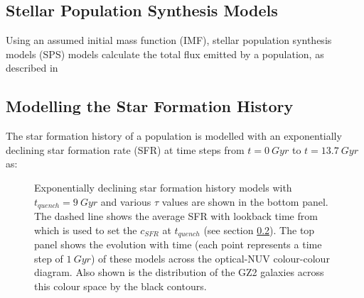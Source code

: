 \documentclass{mn2e}
\begin{document}
\subsection{Stellar Population Synthesis Models}
Using an assumed initial mass function (IMF),  stellar population synthesis models (SPS) models calculate the total flux emitted by a population, as described in \cite{BC03}

\subsection{Modelling the Star Formation History}\label{sfh}
The star formation history of a population is modelled with an exponentially declining star formation rate (SFR) at time steps from $t =0 ~Gyr$ to $t=13.7 ~Gyr$ as:

\begin{figure}
\caption{Exponentially declining star formation history models with $t_{quench}=9~Gyr$ and various $\tau$ values are shown in the bottom panel. The dashed line shows the average SFR with lookback time from \cite{Peng} which is used to set the $c_{SFR}$ at $t_{quench}$ (see section \ref{sfh}). The top panel shows the evolution with time (each point represents a time step of $1 ~Gyr$) of these models across the optical-NUV colour-colour diagram. Also shown is the distribution of the GZ2 galaxies across this colour space by the black contours.}
\label{kev}
\end{figure}
\end{document}
